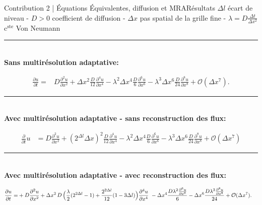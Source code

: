 
\begin{frame}{Contribution 2 | Équations Équivalentes, diffusion et MRA}{Résultats}
    \centering\scriptsize$\Delta l$ écart de niveau - $D>0$ coefficient de diffusion - $\Delta x$ pas spatial de la grille fine - $\lambda = D \frac{\Delta t}{\Delta x^2}$ $\mathrm{c}^\mathrm{ste}$ Von Neumann\\\normalsize
    \noindent\color{Primary}\rule{\linewidth}{0.6pt}\color{black}\\
    \textbf{Sans multirésolution adaptative: }\\
    \begin{center}\footnotesize
        \begin{align}\label{eq:ref:cfl}
            \frac{\partial u}{\partial t}  =&D \frac{\partial^{2}u}{\partial x^{2}}
            + \Delta x^{2} \frac{D}{12}             \frac{\partial^{4}u}{\partial x^{4}} 
            - \lambda^2 \Delta  x^{4} \frac{D}{6}          \frac{\partial^{6}u}{\partial x^{6}} 
            - \lambda^3 \Delta x^{6} \frac{D}{24}        \frac{\partial^{8}u}{\partial x^{8}}  + \mathcal{O}(\Delta x^7).
        \end{align}
    \end{center}\pause
    \noindent\color{Primary}\rule{\linewidth}{0.6pt}\color{black}\\
    \textbf{Avec multirésolution adaptative - sans reconstruction des flux: }\\
        \begin{center}\footnotesize
            \begin{align}\label{eq:sansRecons:cfl}
            \frac{\partial}{\partial t} u&=
                D \frac{\partial^{2}u}{\partial x^{2}}
                + (2^{\Delta l} \Delta x)^{2}  \frac{D}{12} \frac{\partial^{4}u}{\partial x^{4}}
                -\lambda^2 \Delta x^{4} \frac{D}{6}   \frac{\partial^{6}u}{\partial x^{6}}
                -\lambda^3 \Delta x^{6} \frac{D}{24} \frac{\partial^{8}u}{\partial x^{8}} + \mathcal{O}(\Delta x^7)
    \end{align}
        \end{center}\pause
    \noindent\color{Primary}\rule{\linewidth}{0.6pt}\color{black}\\
    \textbf{Avec multirésolution adaptative - avec reconstruction des flux: }\\
        \begin{center}\scriptsize
        \begin{align}\label{eq:equiv_cfl_recons}
            \frac{\partial u}{\partial t}
            =&+ D \frac{\partial^{2}u}{\partial x^{2}}
            + \Delta x^{2}\, D \, \Bigl( 
            \frac{\lambda}{2} (2^{2 \Delta l} - 1) + \frac{2^{2 \Delta l} }{12} (1 - 3 \Delta l)
            \Bigr)\frac{\partial^{4}u}{\partial x^{4}}\
            - \Delta x^{4} \frac{D \lambda^{2} \frac{\partial^{6}u}{\partial x^{6}}}{6} - \Delta x^{6} \frac{D \lambda^{3} \frac{\partial^{8}u}{\partial x^{8}}}{24}
            + \mathcal{O}(\Delta x^7). 
        \end{align}

        \end{center}

\end{frame}